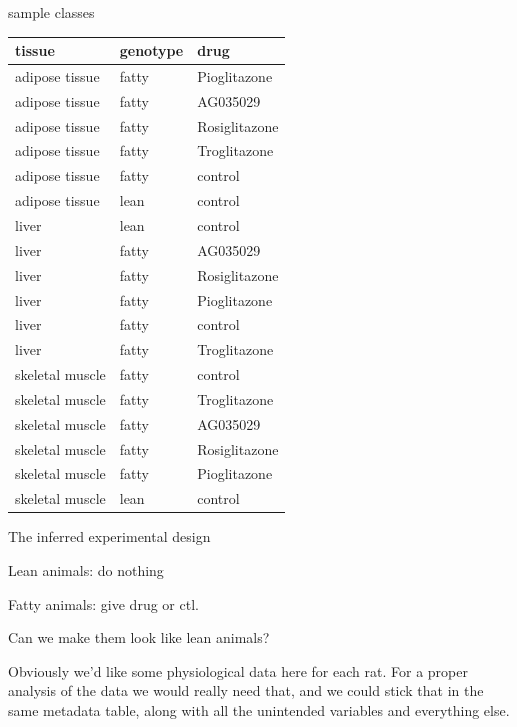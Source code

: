 \documentclass[pdf]{beamer}
\begin{document}
\begin{frame}{sample classes}

  {\footnotesize
  \begin{tabular}{lll} 
    tissue & genotype & drug \\
    \hline
    adipose tissue  & fatty  & Pioglitazone \\
    adipose tissue  & fatty  & AG035029 \\
    adipose tissue  & fatty  & Rosiglitazone \\
    adipose tissue  & fatty  & Troglitazone \\
    adipose tissue  & fatty  & control \\
    adipose tissue  & lean  & control \\
    liver & lean  & control \\
    liver & fatty  & AG035029 \\
    liver & fatty  & Rosiglitazone \\
    liver & fatty  & Pioglitazone \\
    liver & fatty  & control \\
    liver & fatty  & Troglitazone \\
    skeletal muscle  & fatty  & control \\
    skeletal muscle  & fatty  & Troglitazone \\
    skeletal muscle  & fatty  & AG035029 \\
    skeletal muscle  & fatty  & Rosiglitazone \\
    skeletal muscle  & fatty  & Pioglitazone \\
    skeletal muscle  & lean  & control \\
    \end{tabular}
    }
\end{frame}

\begin{frame}{The inferred experimental design}
  
  Lean animals: do nothing

  Fatty animals: give drug or ctl. 

  Can we make them look like
  lean animals?
  
  Obviously we'd like some physiological data here for each rat.
  For a proper analysis of the data we would really need that, and we
  could stick that in the same metadata table, along with all the
  unintended variables and everything else.
\end{frame}
\end{document}
